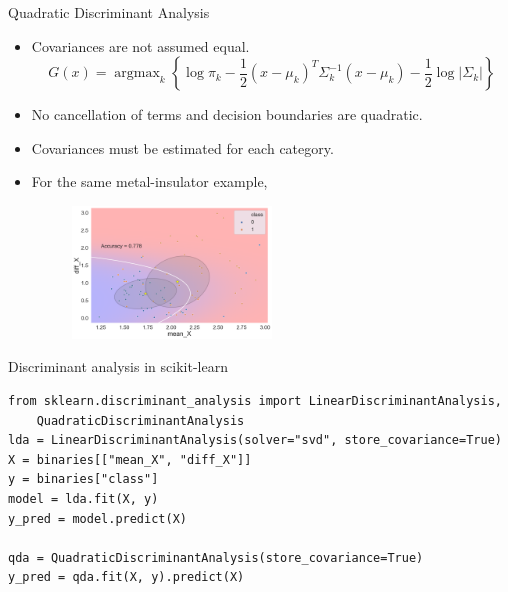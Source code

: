 \documentclass[aspectratio=169]{beamer}
\DeclareMathOperator*{\argmax}{argmax}
\begin{document}
\begin{frame}{Quadratic Discriminant Analysis}
    \begin{itemize}
        \item Covariances are not assumed equal.
        \begin{equation*}
            G(x) = \argmax_k \left \{ \log{\pi_k} -\frac{1}{2}(x-\mu_k)^T\Sigma_k^{-1}(x-\mu_k) -\frac{1}{2} \log{|\Sigma_k|} \right \}
        \end{equation*}
        \item No cancellation of terms and decision boundaries are quadratic.
        \item Covariances must be estimated for each category.
        \item For the same metal-insulator example,
        \begin{figure}
            \centering
            \includegraphics[width=0.5\textwidth]{figures/qda_metal_insulator.png}
        \end{figure}
    \end{itemize}
\end{frame}


\begin{frame}[fragile]{Discriminant analysis in scikit-learn}
\begin{verbatim}
from sklearn.discriminant_analysis import LinearDiscriminantAnalysis,
    QuadraticDiscriminantAnalysis
lda = LinearDiscriminantAnalysis(solver="svd", store_covariance=True)
X = binaries[["mean_X", "diff_X"]]
y = binaries["class"]
model = lda.fit(X, y)
y_pred = model.predict(X)

qda = QuadraticDiscriminantAnalysis(store_covariance=True)
y_pred = qda.fit(X, y).predict(X)
\end{verbatim}
\end{frame} 
\end{document}
